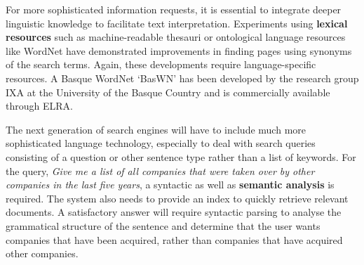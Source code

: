 \begin{multicols}{2}

For more sophisticated information requests, it is essential to integrate deeper linguistic knowledge to facilitate text interpretation. Experiments using \textbf{lexical resources} such as machine-readable thesauri or ontological language resources like WordNet have demonstrated improvements in finding pages using synonyms of the search terms. Again, these developments require language-specific resources. A Basque WordNet ‘BasWN’ has been developed by the research group IXA at the University of the Basque Country and is commercially available through ELRA. 



The next generation of search engines will have to include much more sophisticated language technology, especially to deal with search queries consisting of a question or other sentence type rather than a list of keywords. For the query, \textit{Give me a list of all companies that were taken over by other companies in the last five years}, a syntactic as well as \textbf{semantic analysis} is required. The system also needs to provide an index to quickly retrieve relevant documents. A satisfactory answer will require syntactic parsing to analyse the grammatical structure of the sentence and determine that the user wants companies that have been acquired, rather than companies that have acquired other companies. 


\end{multicols}
